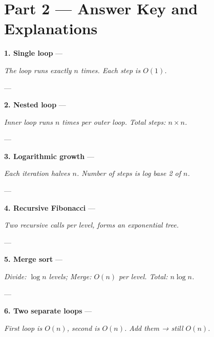 \documentclass{article}
\begin{document}
\newpage

\section*{Part 2 — Answer Key and Explanations}

\textbf{1. Single loop} — 

\textit{The loop runs exactly \( n \) times. Each step is \( O(1) \).}

---

\textbf{2. Nested loop} — 

\textit{Inner loop runs \( n \) times per outer loop. Total steps: \( n \times n \).}

---

\textbf{3. Logarithmic growth} — 

\textit{Each iteration halves \( n \). Number of steps is log base 2 of \( n \).}

---

\textbf{4. Recursive Fibonacci} — 

\textit{Two recursive calls per level, forms an exponential tree.}

---

\textbf{5. Merge sort} — 

\textit{Divide: \( \log n \) levels; Merge: \( O(n) \) per level. Total: \( n \log n \).}

---

\textbf{6. Two separate loops} — 

\textit{First loop is \( O(n) \), second is \( O(n) \). Add them → still \( O(n) \).}
\end{document}
